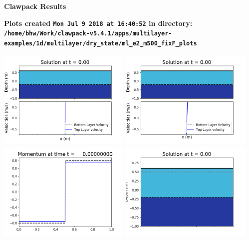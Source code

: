 \documentclass[11pt]{article}
\begin{document}
        \begin{center}{\Large\bf Clawpack Results}\vskip 5pt
        
        \bf Plots created {\tt Mon Jul  9 2018 at 16:40:52} in directory: \vskip 5pt
        \verb+/home/bhw/Work/clawpack-v5.4.1/apps/multilayer-examples/1d/multilayer/dry_state/ml_e2_m500_fixF_plots+
        \end{center}
        \vskip 5pt
        \includegraphics[width=0.475\textwidth]{frame0000fig1001.png}
\includegraphics[width=0.475\textwidth]{frame0000fig1002.png}
\vskip 10pt 
\includegraphics[width=0.475\textwidth]{frame0000fig1003.png}
\includegraphics[width=0.475\textwidth]{frame0000fig1006.png}
\end{document}
